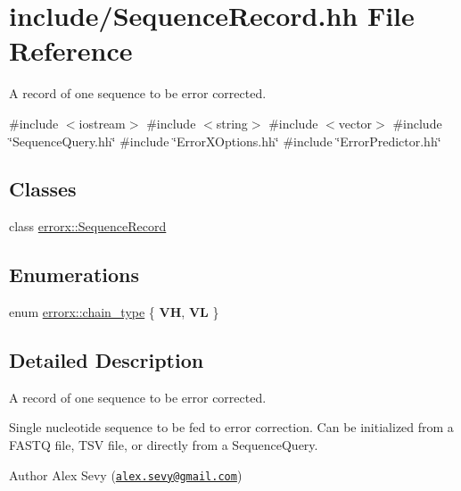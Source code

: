 \hypertarget{_sequence_record_8hh}{}\section{include/\+Sequence\+Record.hh File Reference}
\label{_sequence_record_8hh}


A record of one sequence to be error corrected.  


{\ttfamily \#include $<$iostream$>$}\newline
{\ttfamily \#include $<$string$>$}\newline
{\ttfamily \#include $<$vector$>$}\newline
{\ttfamily \#include \char`\"{}Sequence\+Query.\+hh\char`\"{}}\newline
{\ttfamily \#include \char`\"{}Error\+X\+Options.\+hh\char`\"{}}\newline
{\ttfamily \#include \char`\"{}Error\+Predictor.\+hh\char`\"{}}\newline
\subsection*{Classes}
\begin{DoxyCompactItemize}
\item 
class \mbox{\hyperlink{classerrorx_1_1_sequence_record}{errorx\+::\+Sequence\+Record}}
\end{DoxyCompactItemize}
\subsection*{Enumerations}
\begin{DoxyCompactItemize}
\item 
enum \mbox{\hyperlink{_sequence_record_8hh_a7ec194f8987fd5aa3d34fb5921bff837}{errorx\+::chain\+\_\+type}} \{ {\bfseries VH}, 
{\bfseries VL}
 \}
\end{DoxyCompactItemize}


\subsection{Detailed Description}
A record of one sequence to be error corrected. 

Single nucleotide sequence to be fed to error correction. Can be initialized from a F\+A\+S\+TQ file, T\+SV file, or directly from a Sequence\+Query. \begin{DoxyAuthor}{Author}
Alex Sevy (\href{mailto:alex.sevy@gmail.com}{\tt alex.\+sevy@gmail.\+com}) 
\end{DoxyAuthor}


